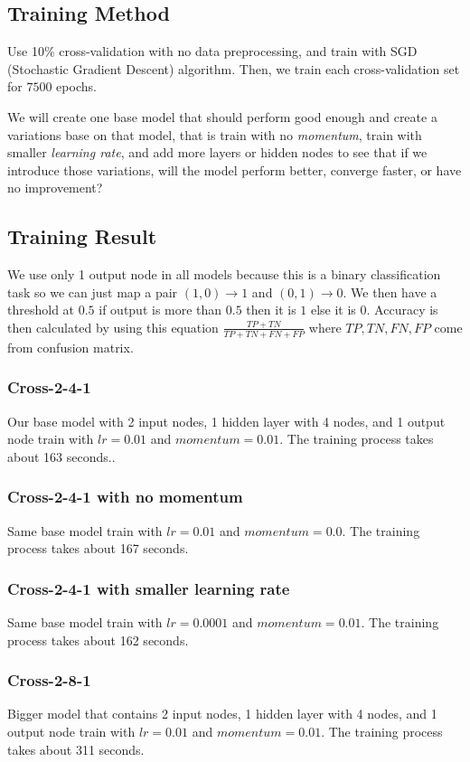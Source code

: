 \documentclass{article}
\begin{document}
\subsection*{Training Method}
Use 10\% cross-validation with no data preprocessing, and train with SGD (Stochastic Gradient Descent) algorithm. 
Then, we train each cross-validation set for $7500$ epochs.

We will create one base model that should perform good enough 
and create a variations base on that model, that is train 
with no \emph{momentum}, train with smaller \emph{learning rate}, 
and add more layers or hidden nodes to see that if we introduce 
those variations, will the model perform better, converge faster, or have no improvement?

\subsection*{Training Result}
We use only 1 output node in all models because this is a binary classification task so we can just map a pair $(1, 0) \rightarrow 1$ and $(0, 1) \rightarrow 0$.
We then have a threshold at $0.5$ if output is more than $0.5$ then it is $1$ else it is $0$.
Accuracy is then calculated by using this equation $\frac{TP+TN}{TP+TN+FN+FP}$ where $TP, TN, FN, FP$ come from confusion matrix.
\subsubsection*{Cross-2-4-1}
Our base model with 2 input nodes, 1 hidden layer with 4 nodes, and 1 output node train with $lr = 0.01$ and $momentum = 0.01$. 
The training process takes about 163 seconds..
\subsubsection*{Cross-2-4-1 with no momentum}
Same base model train with $lr = 0.01$ and $momentum = 0.0$.
The training process takes about 167 seconds.
\subsubsection*{Cross-2-4-1 with smaller learning rate}
Same base model train with $lr = 0.0001$ and $momentum = 0.01$.
The training process takes about 162 seconds.
\subsubsection*{Cross-2-8-1}
Bigger model that contains 2 input nodes, 1 hidden layer with 4 nodes, and 1 output node train with $lr = 0.01$ and $momentum = 0.01$.
The training process takes about 311 seconds.
\end{document}
